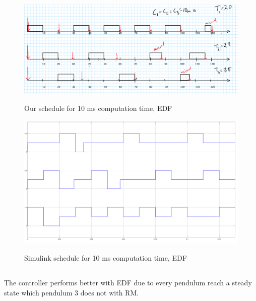 \documentclass[12pt,a4paper]{article}
\begin{document}
\begin{center}
	\begin{figure}
	\includegraphics[scale=0.4]{ex6541.png}
	\label{fig:ex6541}
	\caption{Our schedule for 10 ms computation time, EDF}
	\end{figure}
\end{center}
\begin{center}
	\begin{figure}
	\includegraphics[scale=0.2]{ex6542.png}
	\label{fig:ex6542}
	\caption{Simulink schedule for 10 ms computation time, EDF}
	\end{figure}
\end{center}

\subsection{}
The controller performs better with EDF due to every pendulum reach a steady state which pendulum 3 does not with RM. 
\end{document}
